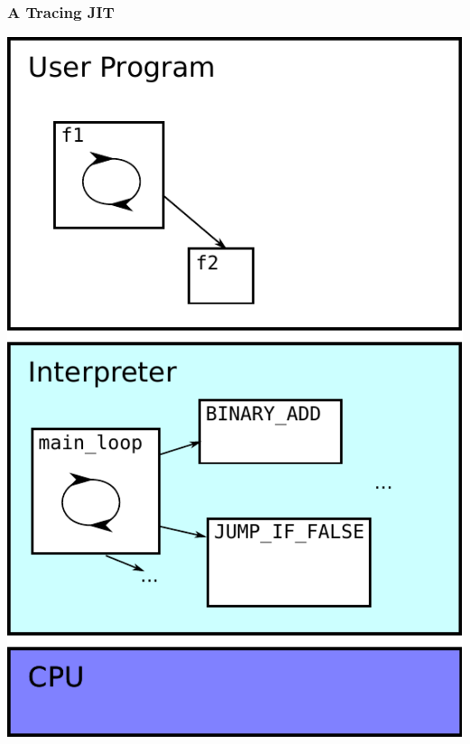 \documentclass[utf8x]{beamer}
\begin{document}
\begin{frame}
  \frametitle{A Tracing JIT}
  \includegraphics[scale=0.5]{figures/trace01.pdf}
\end{frame}
\end{document}
